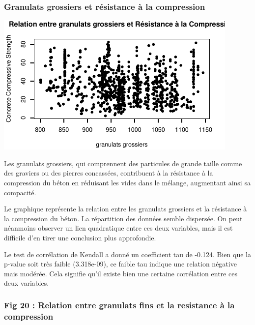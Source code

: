 \documentclass[
  12pt,
]{article}
\begin{document}
\subsubsection{Granulats grossiers et résistance à la
compression}\label{granulats-grossiers-et-ruxe9sistance-uxe0-la-compression}

\begin{center}\includegraphics{rmd_final_files/figure-latex/unnamed-chunk-22-1} \end{center}

Les granulats grossiers, qui comprennent des particules de grande taille
comme des graviers ou des pierres concassées, contribuent à la
résistance à la compression du béton en réduisant les vides dans le
mélange, augmentant ainsi sa compacité.

Le graphique représente la relation entre les granulats grossiers et la
résistance à la compression du béton. La répartition des données semble
dispersée. On peut néanmoins observer un lien quadratique entre ces deux
variables, mais il est difficile d'en tirer une conclusion plus
approfondie.

Le test de corrélation de Kendall a donné un coefficient tau de -0.124.
Bien que la p-value soit très faible (3.318e-09), ce faible tau indique
une relation négative mais modérée. Cela signifie qu'il existe bien une
certaine corrélation entre ces deux variables.

\subsubsection{Fig 20 : Relation entre granulats fins et la resistance à
la
compression}\label{fig-20-relation-entre-granulats-fins-et-la-resistance-uxe0-la-compression}
\end{document}
